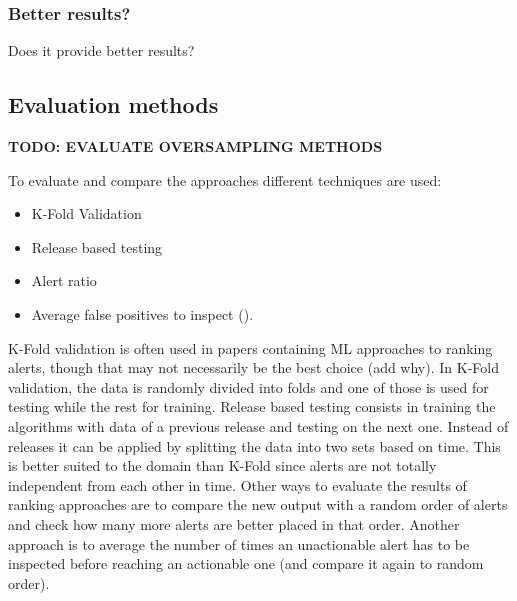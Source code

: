 \documentclass{article}
\begin{document}
\subsubsection{Better results?}
Does it provide better results?


\subsection{Evaluation methods}

\textbf{TODO: EVALUATE OVERSAMPLING METHODS}

To evaluate and compare the approaches different techniques are used: 
\begin{itemize}
    \item K-Fold Validation
    \item Release based testing
    \item Alert ratio
    \item Average false positives to inspect (\cite{z-ranking}).
\end{itemize}

K-Fold validation is often used in papers containing ML approaches to ranking alerts, though that may not necessarily be the best choice (add why). In K-Fold validation, the data is randomly divided into folds and one of those is used for testing while the rest for training. Release based testing consists in training the algorithms with data of a previous release and testing on the next one. Instead of releases it can be applied by splitting the data into two sets based on time. This is better suited to the domain than K-Fold since alerts are not totally independent from each other in time.
Other ways to evaluate the results of ranking approaches are to compare the new output with a random order of alerts and check how many more alerts are better placed in that order. Another approach is to average the number of times an unactionable alert has to be inspected before reaching an actionable one (and compare it again to random order).
\end{document}

